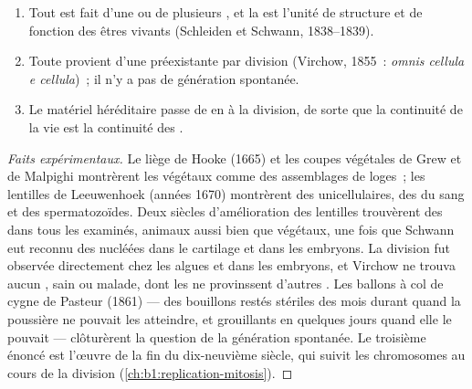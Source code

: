 \begin{proposition}\label{prop:b1:cell-unit-of-life:theory}
\begin{enumerate}
  \item Tout  est fait d'une ou de plusieurs , et la
         est l'unité de structure et de fonction des êtres
        vivants (Schleiden et Schwann, 1838--1839).
  \item Toute  provient d'une  préexistante par division
        (Virchow, 1855~: \emph{omnis cellula e cellula})~; il n'y a pas
        de génération spontanée.
  \item Le matériel héréditaire passe de  en  à la
        division, de sorte que la continuité de la vie est la continuité
        des .
\end{enumerate}
\end{proposition}
\begin{proof}[Faits expérimentaux]
Le liège de Hooke (1665) et les coupes végétales de Grew et de Malpighi
montrèrent les  végétaux comme des assemblages de loges~; les
lentilles de Leeuwenhoek (années 1670) montrèrent des 
unicellulaires, des  du sang et des spermatozoïdes. Deux siècles
d'amélioration des lentilles trouvèrent des  dans tous les
 examinés, animaux aussi bien que végétaux, une fois que Schwann
eut reconnu des  nucléées dans le cartilage et dans les embryons.
La division fut observée directement chez les algues et dans les
embryons, et Virchow ne trouva aucun , sain ou malade, dont les
 ne provinssent d'autres . Les ballons à col de cygne de
Pasteur (1861) --- des bouillons restés stériles des mois durant quand
la poussière ne pouvait les atteindre, et grouillants en quelques jours
quand elle le pouvait --- clôturèrent la question de la génération
spontanée. Le troisième énoncé est l'œuvre de la fin du dix-neuvième
siècle, qui suivit les chromosomes au cours de la division
(\cref{ch:b1:replication-mitosis}).
\end{proof}

